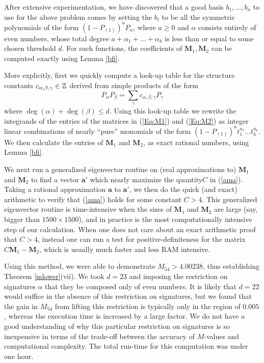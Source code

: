 After extensive experimentation, we have discovered that a good basis $b_1,\dots,b_n$ to use for the above problem comes by setting the $b_i$ to be all the symmetric polynomials of the form $(1-P_{(1)})^a P_\alpha$, where $a \geq 0$ and $\alpha$ consists entirely of even numbers, whose total degree $a + \alpha_1+\dots +\alpha_k$ is less than or equal to some chosen threshold $d$.  For such functions, the coefficients of $\mathbf{M}_1,\mathbf{M}_2$ can be computed exactly using Lemma \ref{bfi}.

More explicitly, first we quickly compute a look-up table for the structure constants $c_{\alpha,\beta,\gamma}\in \mathbb{Z}$ derived from simple products of the form
\[
P_{\alpha}P_{\beta}=\sum_{\gamma}c_{\alpha,\beta,\gamma}P_{\gamma}
\]
where $\deg(\alpha)+\deg(\beta)\leq d$.  Using this look-up table we rewrite the integrands of the entries of the matrices in (\ref{Eq:M1}) and (\ref{Eq:M2}) as integer linear combinations of nearly ``pure'' monomials of the form $(1-P_{(1)})^a t_1^{a_1}\dots t_k^{a_k}$.  We then calculate the entries of $\mathbf{M}_1$ and $\mathbf{M}_2$, as exact rational numbers, using Lemma \ref{bfi}.

We next run a generalized eigenvector routine on (real approximations to) $\mathbf{M}_1$ and $\mathbf{M}_2$ to find a vector $\mathbf{a}'$ which nearly maximize the quantity$C$ in (\ref{ama}).  Taking a rational approximation $\mathbf{a}$ to $\mathbf{a}'$, we then do the quick (and exact) arithmetic to verify that (\ref{ama}) holds for some constant $C>4$.  This generalized eigenvector routine is time-intensive when the sizes of $\mathbf{M}_1$ and $\mathbf{M}_2$ are large (say, bigger than $1500\times 1500$), and in practice  is the most computationally intensive step of our calculation.  When one does not care about an exact arithmetic proof that $C>4$, instead one can run a test for positive-definiteness for the matrix $C\mathbf{M}_1-\mathbf{M}_2$, which is usually much faster and less RAM intensive.

Using this method, we were able to demonstrate $M_{54} > 4.00238$, thus establishing Theorem \ref{mlower}(vii).  We took $d=23$ and imposing the restriction on signatures $\alpha$ that they be composed only of even numbers. It is likely that $d=22$ would suffice in the absence of this restriction on signatures, but we found that the gain in $M_{54}$ from lifting this restriction is typically only in the region of $0.005$, whereas the execution time is increased by a large factor. We do not have a good understanding of why this particular restriction on signatures is so inexpensive in terms of the trade-off between the accuracy of $M$-values and computational complexity.  The total run-time for this computation was under one hour.


